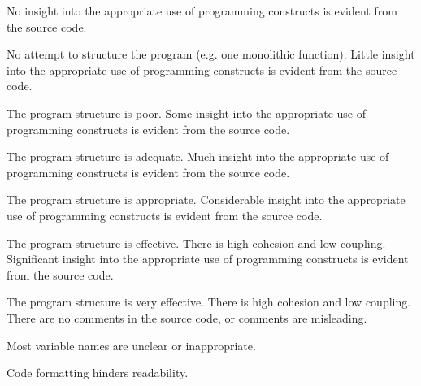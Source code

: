 \documentclass{../../fal_assignment}
\begin{document}
\begin{markingrubric}
	\grade\fail No insight into the appropriate use of programming constructs is evident from the source code.
	\par No attempt to structure the program (e.g. one monolithic function).
	\grade Little insight into the appropriate use of programming constructs is evident from the source code.
	\par The program structure is poor.
	\grade Some insight into the appropriate use of programming constructs is evident from the source code.
	\par The program structure is adequate.
	\grade Much insight into the appropriate use of programming constructs is evident from the source code.
	\par The program structure is appropriate.
	\grade Considerable insight into the appropriate use of programming constructs is evident from the source code.
	\par The program structure is effective. There is high cohesion and low coupling.
	\grade Significant insight into the appropriate use of programming constructs is evident from the source code.
	\par The program structure is very effective. There is high cohesion and low coupling.
	\grade\fail There are no comments in the source code, or comments are misleading.
	\par Most variable names are unclear or inappropriate.
	\par Code formatting hinders readability.

\end{markingrubric}
\end{document}
